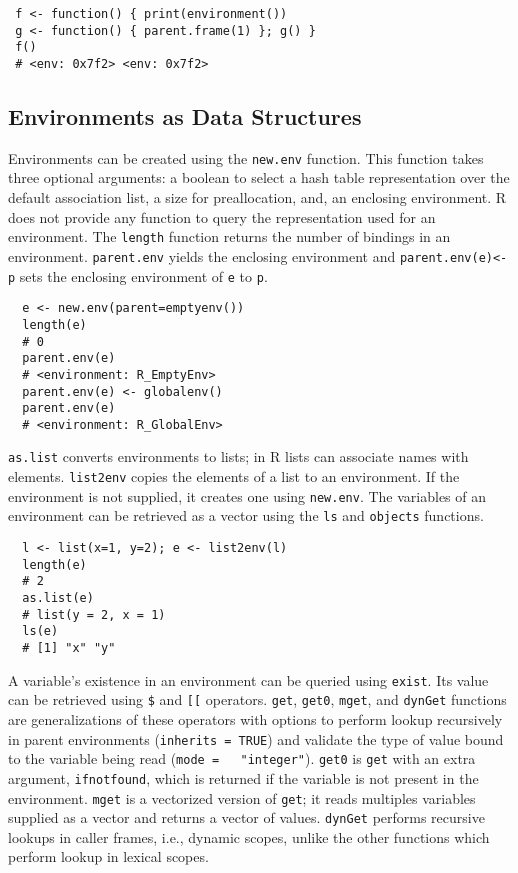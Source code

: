 \documentclass[10pt,review,sigplan,anonymous=true,authorversion=true,nonacm=true]{acmart}
\newcommand{\code}[1]{\lstinline |#1|\xspace}
\newcommand{\newEnv}{\code{new.env}}
\newcommand{\asList}{\code{as.list}}
\newcommand{\listToEnv}{\code{list2env}}
\newcommand{\ls}{\code{ls}}
\newcommand{\objects}{\code{objects}}
\newcommand{\subDollar}{\code{$}}
\newcommand{\subBracket}{\code{[[}}
\newcommand{\exist}{\code{exist}}
\newcommand{\get}{\code{get}}
\newcommand{\getZero}{\code{get0}}
\newcommand{\mget}{\code{mget}}
\newcommand{\dynGet}{\code{dynGet}}
\newcommand{\parentEnv}{\code{parent.env}}
\begin{document}
\begin{lstlisting}
 f <- function() { print(environment())
 g <- function() { parent.frame(1) }; g() }
 f()
 # <env: 0x7f2> <env: 0x7f2>
\end{lstlisting}

\subsection{Environments as Data Structures}

Environments can be created using the \newEnv function. This function takes
three optional arguments: a boolean to select a hash table representation over
the default association list, a size for preallocation, and, an enclosing
environment. R does not provide any function to query the representation used
for an environment. The \code{length} function returns the number of bindings in
an environment. \parentEnv yields the enclosing environment and
\code{parent.env(e)<-p} sets the enclosing environment of \code{e} to \code{p}.

\begin{lstlisting}
  e <- new.env(parent=emptyenv())
  length(e)
  # 0
  parent.env(e)
  # <environment: R_EmptyEnv>
  parent.env(e) <- globalenv()
  parent.env(e)
  # <environment: R_GlobalEnv>
\end{lstlisting}

\asList converts environments to lists; in R lists can associate names with
elements. \listToEnv copies the elements of a list to an environment. If the
environment is not supplied, it creates one using \newEnv. The variables of an
environment can be retrieved as a vector using the \ls and \objects functions.

\begin{lstlisting}
  l <- list(x=1, y=2); e <- list2env(l)
  length(e)
  # 2
  as.list(e)
  # list(y = 2, x = 1)
  ls(e)
  # [1] "x" "y"
\end{lstlisting}

\noindent
A variable's existence in an environment can be queried using \exist. Its value
can be retrieved using \subDollar and \subBracket operators. \get, \getZero,
\mget, and \dynGet functions are generalizations of these operators with options
to perform lookup recursively in parent environments (\code{inherits = TRUE})
and validate the type of value bound to the variable being read (\code{mode =
  "integer"}). \getZero is \get with an extra argument, \code{ifnotfound}, which
is returned if the variable is not present in the environment. \mget is a
vectorized version of \get; it reads multiples variables supplied as a vector
and returns a vector of values. \dynGet performs recursive lookups in caller
frames, i.e., dynamic scopes, unlike the other functions which perform lookup in
lexical scopes.
\end{document}
